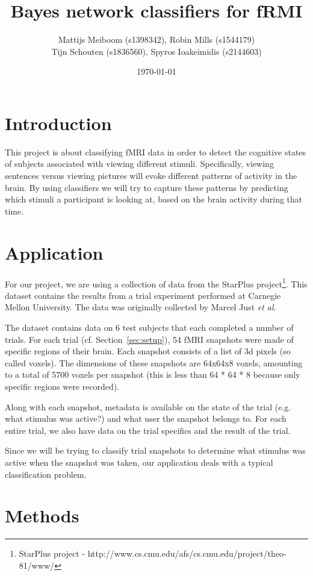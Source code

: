 \documentclass[a4paper, 11pt]{scrartcl}
\title{\Large Bayes network classifiers for fRMI}
\author{\small Mattijs Meiboom (s1398342), Robin Mills (s1544179)\\
			\small Tijn Schouten (s1836560), Spyros Ioakeimidis (s2144603)}
\date{\small \today}
\begin{document}
\maketitle

\thispagestyle{empty}

\section{Introduction}

This project is about classifying fMRI data in order to detect the cognitive states of subjects associated with viewing different stimuli. Specifically, viewing sentences versus viewing pictures will evoke different patterns of activity in the brain. By using classifiers we will try to capture these patterns by predicting which stimuli a participant is looking at, based on the brain activity during that time.

\section{Application}

For our project, we are using a collection of data from the StarPlus project\footnote{StarPlus project - http://www.cs.cmu.edu/afs/cs.cmu.edu/project/theo-81/www/}. This dataset contains the results from a trial experiment performed at Carnegie Mellon University. The data was originally collected by Marcel Just \textit{et al}.

The dataset contains data on 6 test subjects that each completed a number of trials. For each trial (cf. Section~\ref{sec:setup}), 54 fMRI snapshots were made of specific regions of their brain. Each snapshot consists of a list of 3d pixels (so called voxels). The dimensions of these snapshots are 64x64x8 voxels, amounting to a total of 5700 voxels per snapshot (this is less than 64 * 64 * 8 because only specific regions were recorded).

Along with each snapshot, metadata is available on the state of the trial (e.g. what stimulus was active?) and what user the snapshot belongs to. For each entire trial, we also have data on the trial specifics and the result of the trial.

Since we will be trying to classify trial snapshots to determine what stimulus was active when the snapshot was taken, our application deals with a typical classification problem.

\section{Methods}
\end{document}
